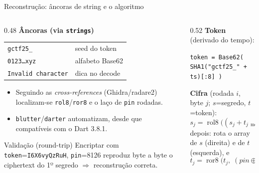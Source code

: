 \documentclass[aspectratio=169]{beamer}
\begin{document}
\begin{frame}{Reconstrução: âncoras de string e o algoritmo}
  \begin{columns}[T]
    \begin{column}{0.48\textwidth}
      \textbf{Âncoras (via \texttt{strings})}
      \begin{tabular}{@{}l l@{}}
        \texttt{gctf25\_} & seed do token\\
        \texttt{0123\ldots xyz} & alfabeto Base62\\
        \texttt{Invalid character} & dica no decode\\
      \end{tabular}
      \vspace{0.4em}
      \begin{itemize}
        \item Seguindo as \emph{cross-references} (Ghidra/radare2) localizam-se
              \texttt{rol8}/\texttt{ror8} e o laço de \texttt{pin} rodadas.
        \item \texttt{blutter}/\texttt{darter} automatizam, desde que
              compatíveis com o Dart 3.8.1.
      \end{itemize}
      \begin{block}{Validação (round-trip)}
        Encriptar com \texttt{token}=\texttt{I6X6vyQzRuH},
        \texttt{pin}=8126 reproduz \alert{byte a byte} o ciphertext do 1º
        segredo $\Rightarrow$ reconstrução correta.
      \end{block}
    \end{column}
    \begin{column}{0.52\textwidth}
      \textbf{Token} (derivado do tempo):
      \begin{center}
        {\footnotesize \texttt{token = Base62( SHA1("gctf25\_" + ts)[:8] )}}
      \end{center}
      \textbf{Cifra} (rodada $i$, byte $j$; $s$=segredo, $t$=token):
      {\small
      \[
        s_j = \operatorname{rol8}\!\big((s_j + t_{j \bmod 8}) \bmod 256,\; j \bmod 8\big)
      \]}
      depois: rota o array de $s$ (direita) e de $t$ (esquerda), e
      {\small
      \[
        t_j = \operatorname{ror8}\!\big(t_j,\; (pin \oplus ((i \bmod 4)+1)) \bmod 8\big)
      \]}
    \end{column}
  \end{columns}
\end{frame}
\end{document}
